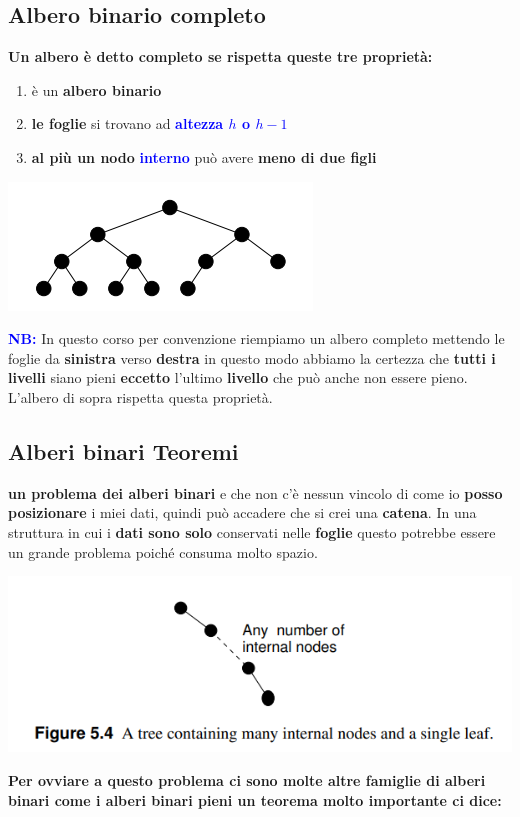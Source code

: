 \subsection{Albero binario completo}
\textbf{Un albero è detto completo se rispetta queste tre proprietà:}
\begin{enumerate}
    \item è un \textbf{albero binario}
    \item \textbf{le foglie} si trovano ad \textcolor{blue}{\textbf{altezza $h$ o $h-1$}}
    \item \textbf{al più un nodo} \textbf{\textcolor{blue}{interno}} può avere \textbf{meno di due figli}
\end{enumerate}
\begin{center}
    \includegraphics[scale = 0.8]{Capitoli/Alberi Binari/Esempi/alberocompleto.png}
\end{center}
\begin{tcolorbox}
    \textbf{\textcolor{blue}{NB:}} In questo corso per convenzione riempiamo un albero completo mettendo le foglie da \textbf{sinistra} verso \textbf{destra} in questo modo abbiamo la certezza che \textbf{tutti i livelli} siano pieni \textbf{eccetto} l'ultimo \textbf{livello} che può anche non essere pieno. L'albero di sopra rispetta questa proprietà.
\end{tcolorbox}

\subsection{Alberi binari Teoremi}
\textbf{un problema dei alberi binari} e che non c'è nessun vincolo di come io \textbf{posso posizionare} i miei dati, quindi può accadere che si crei una \textbf{catena}. In una struttura in cui i \textbf{dati sono solo} conservati nelle \textbf{foglie} questo potrebbe essere un grande problema poiché consuma molto spazio.
\begin{center}
    \includegraphics[scale = 0.6]{Capitoli/Alberi Binari/Esempi/catena.png}
\end{center}
\textbf{Per ovviare a questo problema ci sono molte altre famiglie di alberi binari come i alberi binari pieni un teorema molto importante ci dice:}
